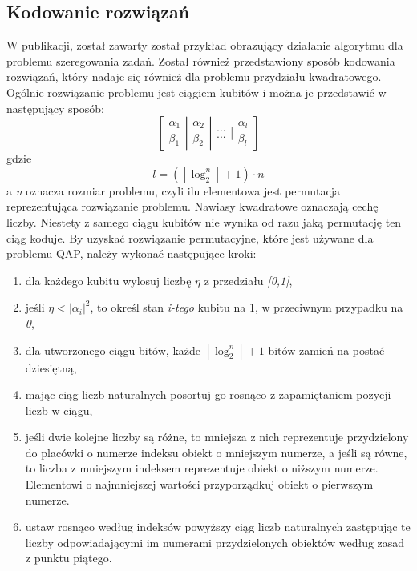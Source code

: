 \subsection{Kodowanie rozwiązań}
W publikacji, został zawarty został przykład obrazujący działanie algorytmu dla problemu szeregowania zadań. Został również przedstawiony sposób kodowania rozwiązań, który nadaje się również dla problemu przydziału kwadratowego. Ogólnie rozwiązanie problemu jest ciągiem kubitów i można je przedstawić w następujący sposób:
\newline
\begin{equation}
\left[ \begin{array}{ccc} \alpha_1 \\ \beta_1 \end{array} \right| \left. \begin{array}{ccc} \alpha_2 \\ \beta_2 \end{array}  \right| \left. \begin{array}{ccc} ... \\ ... \end{array}  \right| \left. \begin{array}{ccc} \alpha_l \\ \beta_l \end{array}  \right]
\end{equation}
\newline
gdzie 
\newline
\begin{equation}
l=([\log_2^n] + 1)\cdot n
\end{equation}
\newline
a \textit{n} oznacza rozmiar problemu, czyli ilu elementowa jest permutacja reprezentująca rozwiązanie problemu. Nawiasy kwadratowe oznaczają cechę liczby.
Niestety z samego ciągu kubitów nie wynika od razu jaką permutację ten ciąg koduje. By uzyskać rozwiązanie permutacyjne, które jest używane dla problemu QAP, należy wykonać następujące kroki:
\begin{enumerate}
\item dla każdego kubitu wylosuj liczbę $\eta$ z przedziału \textit{[0,1]},
\item jeśli $\eta < |\alpha_i|^2$, to określ stan \textit{i-tego} kubitu na 1, w przeciwnym przypadku na \textit{0},
\item dla utworzonego ciągu bitów, każde $[\log_2^n] + 1$ bitów zamień na postać dziesiętną,
\item mając ciąg liczb naturalnych posortuj go rosnąco z zapamiętaniem pozycji liczb w ciągu,
\item jeśli dwie kolejne liczby są różne, to mniejsza z nich reprezentuje przydzielony do placówki o numerze indeksu obiekt o mniejszym numerze, a jeśli są równe, to liczba z mniejszym indeksem reprezentuje obiekt o niższym numerze. Elementowi o najmniejszej wartości przyporządkuj obiekt o pierwszym numerze.
\item ustaw rosnąco według indeksów powyższy ciąg liczb naturalnych zastępując te liczby odpowiadającymi im numerami przydzielonych obiektów według zasad z punktu piątego.
\end{enumerate}
